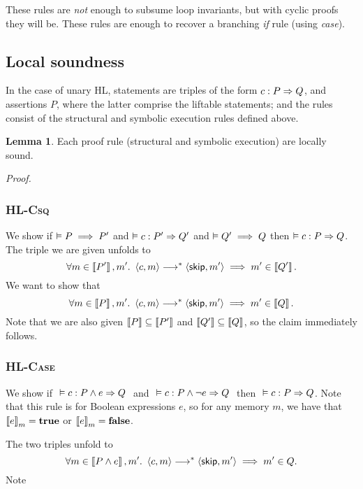 \documentclass[10pt]{article}
\theoremstyle{definition}
\newtheorem{lemma}{Lemma}
\begin{document}
\noindent
These rules are \emph{not} enough to subsume loop invariants, but with cyclic proofs they will be.
These rules are enough to recover a branching \emph{if} rule (using \emph{case}).



\subsection*{Local soundness}
In the case of unary HL,
statements are triples of the form
$\Triple c : P => Q$, and
assertions $P$,
where the latter comprise the liftable statements;
and the rules consist of the structural and symbolic execution rules defined above.


\begin{lemma}
    Each proof rule (structural and symbolic execution) are locally sound.
\end{lemma}

\noindent
\emph{Proof.}

\subsubsection*{\textsc{HL-Csq}}
We show if $\vDash P \implies P'$ and 
      $\VAL \Triple c : P' => Q'$ and 
      $\vDash Q' \implies Q$
then $\VAL \Triple c : P => Q$.
The triple we are given unfolds to
\[
    \forall m \in \Interp{P'}, m'.\
    \Cfg(c, m) \sstepstotrans \Cfg(\Skip, m')
    \implies m' \in \Interp{Q'}.
\]
We want to show that
\[
    \forall m \in \Interp P, m'.\
    \Cfg(c, m) \sstepstotrans \Cfg(\Skip, m')
    \implies m' \in \Interp Q.
\]
Note that we are also given $\left\llbracket P \right\rrbracket \subseteq \left\llbracket P' \right\rrbracket$ and $\left\llbracket Q' \right\rrbracket \subseteq \left\llbracket Q \right\rrbracket$,
so the claim immediately follows.

\subsubsection*{\textsc{HL-Case}}
We show if $\ \VAL \Triple c : P \wedge e => Q\ $ and
      $\ \VAL \Triple c : P \wedge \neg e => Q\ $ then
    $\ \VAL \Triple c : P => Q$.
Note that this rule is for Boolean expressions $e$,
so for any memory $m$, we have that $\Eval(e,m) = \True$
or $\Eval(e,m) = \False$.

The two triples unfold to
\[
    \forall m \in \Interp{P \wedge e}, m'.\
    \Cfg(c, m) \sstepstotrans \Cfg(\Skip, m') 
    \implies m' \in Q.
\]
Note
\end{document}
